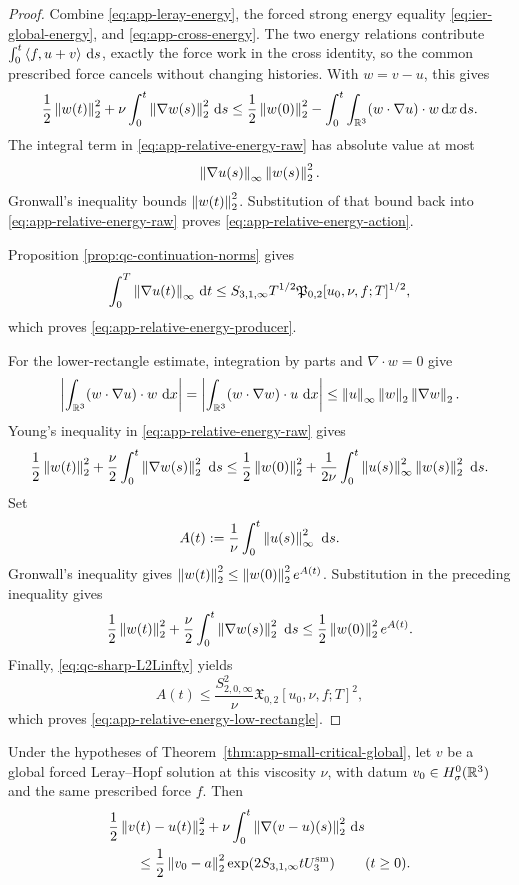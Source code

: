 \begin{proof}
Combine \eqref{eq:app-leray-energy}, the forced strong energy equality
\eqref{eq:ier-global-energy}, and \eqref{eq:app-cross-energy}.  The two
energy relations contribute
\(\int_0^t\left\langle f,u+v\right\rangle\,\mathrm d s\), exactly the force work in the cross identity,
so the common prescribed force cancels without changing histories.  With
\(w=v-u\), this gives
\begin{equation}
 \frac12\left\lVert w(t)\right\rVert_2^2
 +\nu\int_0^t\left\lVert \nabla w(s)\right\rVert_2^2\,\mathrm d s
 \le
 \frac12\left\lVert w(0)\right\rVert_2^2
 -\int_0^t\int_{\mathbb R^3}(w\cdot\nabla u)\cdot w\,\mathrm d x\,\mathrm d s.
 \label{eq:app-relative-energy-raw}
\end{equation}
The integral term in \eqref{eq:app-relative-energy-raw} has absolute value at
most
\[
 \left\lVert \nabla u(s)\right\rVert_\infty\left\lVert w(s)\right\rVert_2^2.
\]
Gronwall's inequality bounds \(\left\lVert w(t)\right\rVert_2^2\).  Substitution of that
bound back into \eqref{eq:app-relative-energy-raw} proves
\eqref{eq:app-relative-energy-action}.
\begin{samepage}
Proposition
\ref{prop:qc-continuation-norms} gives
\[
 \int_0^T\left\lVert \nabla u(t)\right\rVert_\infty\,\mathrm d t
 \le
 S_{3,1,\infty}T^{1/2}
 \mathfrak P_{0,2}[u_0,\nu,f;T]^{1/2},
\]
which proves \eqref{eq:app-relative-energy-producer}.
\end{samepage}

For the lower-rectangle estimate, integration by parts and
\(\nabla\cdot w=0\) give
\[
 \left|\int_{\mathbb R^3}(w\cdot\nabla u)\cdot w\,\,\mathrm d x\right|
 =\left|\int_{\mathbb R^3}(w\cdot\nabla w)\cdot u\,\,\mathrm d x\right|
 \le\left\lVert u\right\rVert_\infty\left\lVert w\right\rVert_2\left\lVert \nabla w\right\rVert_2.
\]
Young's inequality in \eqref{eq:app-relative-energy-raw} gives
\begin{align*}
 \frac12\left\lVert w(t)\right\rVert_2^2
 +\frac\nu2\int_0^t\left\lVert \nabla w(s)\right\rVert_2^2\,\,\mathrm d s
 \le\frac12\left\lVert w(0)\right\rVert_2^2
 +\frac1{2\nu}\int_0^t\left\lVert u(s)\right\rVert_\infty^2
 \left\lVert w(s)\right\rVert_2^2\,\,\mathrm d s.
\end{align*}
Set
\[
 A(t):=\frac1\nu\int_0^t\left\lVert u(s)\right\rVert_\infty^2\,\,\mathrm d s.
\]
Gronwall's inequality gives
\(\left\lVert w(t)\right\rVert_2^2\le\left\lVert w(0)\right\rVert_2^2e^{A(t)}\).  Substitution in the
preceding inequality gives
\[
 \frac12\left\lVert w(t)\right\rVert_2^2
 +\frac\nu2\int_0^t\left\lVert \nabla w(s)\right\rVert_2^2\,\,\mathrm d s
 \le\frac12\left\lVert w(0)\right\rVert_2^2e^{A(t)}.
\]
Finally, \eqref{eq:qc-sharp-L2Linfty} yields
\[
 A(t)\le\frac{S_{2,0,\infty}^2}{\nu}
 \mathfrak X_{0,2}[u_0,\nu,f;T]^2,
\]
which proves \eqref{eq:app-relative-energy-low-rectangle}.
\end{proof}

\begin{corollary}
\label{cor:app-small-weak-stability}
Under the hypotheses of Theorem~\ref{thm:app-small-critical-global}, let
\(v\) be a global forced Leray--Hopf solution at this viscosity \(\nu\),
with datum \(v_0\in H^0_\sigma(\mathbb R^3)\) and the same prescribed force
\(f\).
Then
\begin{align}
 &\frac12\left\lVert v(t)-u(t)\right\rVert_2^2
 +\nu\int_0^t\left\lVert \nabla(v-u)(s)\right\rVert_2^2\,\mathrm d s
 \notag\\
 &\qquad\le
 \frac12\left\lVert v_0-a\right\rVert_2^2
 \exp\!\left(2S_{3,1,\infty}tU_3^{\rm sm}\right)
 \qquad(t\ge0).
 \label{eq:app-small-weak-stability}
\end{align}
\end{corollary}

